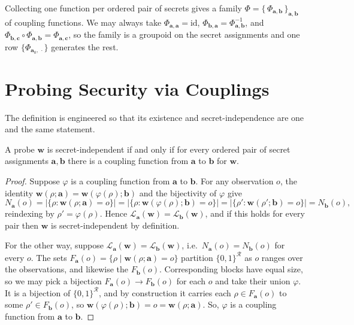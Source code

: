   Collecting one function per ordered pair of secrets gives a family
  $\Phi = \{\, \Phi_{\mathbf{a},\mathbf{b}} \,\}_{\mathbf{a},\mathbf{b}}$ of coupling
  functions. We may always take $\Phi_{\mathbf{a},\mathbf{a}} = \mathrm{id}$,
  $\Phi_{\mathbf{b},\mathbf{a}} = \Phi_{\mathbf{a},\mathbf{b}}^{-1}$, and
  $\Phi_{\mathbf{b},\mathbf{c}} \circ \Phi_{\mathbf{a},\mathbf{b}} =
  \Phi_{\mathbf{a},\mathbf{c}}$, so the family is a groupoid on the secret
  assignments and one row $\{\Phi_{\mathbf{a}_0,\,\cdot}\}$ generates the rest.

\section{Probing Security via Couplings}
\label{sec:probing-via-couplings}

The definition is engineered so that its existence and secret-independence are one
and the same statement.

\begin{theorem}
\label{thm:coupling-equiv}
A probe $\mathbf{w}$ is secret-independent if and only if for every ordered pair of secret
assignments $\mathbf{a}, \mathbf{b}$ there is a coupling function from $\mathbf{a}$
to $\mathbf{b}$ for $\mathbf{w}$.
\end{theorem}

\begin{proof}
Suppose $\varphi$ is a coupling function from
$\mathbf{a}$ to $\mathbf{b}$. For any observation $o$, the identity
$\mathbf{w}(\rho; \mathbf{a}) = \mathbf{w}(\varphi(\rho); \mathbf{b})$ and the bijectivity of
$\varphi$ give
\[
  N_{\mathbf{a}}(o) = \big|\{\rho : \mathbf{w}(\rho; \mathbf{a}) = o\}\big|
  = \big|\{\rho : \mathbf{w}(\varphi(\rho); \mathbf{b}) = o\}\big|
  = \big|\{\rho' : \mathbf{w}(\rho'; \mathbf{b}) = o\}\big| = N_{\mathbf{b}}(o) ,
\]
reindexing by $\rho' = \varphi(\rho)$. Hence
$\mathcal{L}_{\mathbf{a}}(\mathbf{w}) = \mathcal{L}_{\mathbf{b}}(\mathbf{w})$, and if this holds for
every pair then $\mathbf{w}$ is secret-independent by definition.

For the other way, suppose
$\mathcal{L}_{\mathbf{a}}(\mathbf{w}) = \mathcal{L}_{\mathbf{b}}(\mathbf{w})$, i.e.\
$N_{\mathbf{a}}(o) = N_{\mathbf{b}}(o)$ for every $o$. The sets
$F_{\mathbf{a}}(o) = \{\rho \mid \mathbf{w}(\rho; \mathbf{a}) = o\}$ partition
$\{0,1\}^{\mathcal{R}}$ as $o$ ranges over the observations, and likewise the
$F_{\mathbf{b}}(o)$. Corresponding blocks have equal size, so we may pick a
bijection $F_{\mathbf{a}}(o) \to F_{\mathbf{b}}(o)$ for each $o$ and take their
union $\varphi$. It is a bijection of $\{0,1\}^{\mathcal{R}}$, and by construction
it carries each $\rho \in F_{\mathbf{a}}(o)$ to some
$\rho' \in F_{\mathbf{b}}(o)$, so $\mathbf{w}(\varphi(\rho); \mathbf{b}) = o =
\mathbf{w}(\rho; \mathbf{a})$. So, $\varphi$ is a coupling function from $\mathbf{a}$ to
$\mathbf{b}$.
\end{proof}


